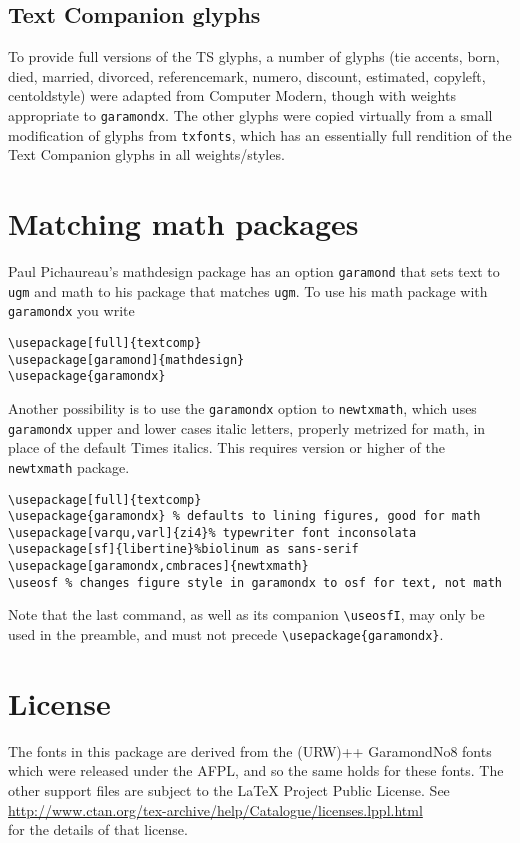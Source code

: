 \documentclass[11pt]{article}
\begin{document}
\subsection{Text Companion glyphs} To provide full versions of the TS glyphs, a number of glyphs (tie accents, born, died, married, divorced, referencemark, numero, discount, estimated, copyleft, centoldstyle) were adapted from Computer Modern, though with weights appropriate to {\tt garamondx}. The other glyphs were copied virtually from a small modification of glyphs from {\tt txfonts}, which has an essentially full rendition of the Text Companion glyphs in all weights/styles.
\section{Matching math packages}
Paul Pichaureau's \textsf{mathdesign} package has an option \texttt{garamond} that sets text to \texttt{ugm} and math to his package that matches \texttt{ugm}. To use his math package with \texttt{garamondx} you write
\begin{verbatim}
\usepackage[full]{textcomp}
\usepackage[garamond]{mathdesign}
\usepackage{garamondx}
\end{verbatim}
Another possibility is to use the \texttt{garamondx} option to \texttt{newtxmath}, which uses \texttt{garamondx} upper and lower cases italic letters, properly metrized for math, in place of the default Times italics. This requires version  or higher of the \texttt{newtxmath} package. 
\begin{verbatim}
\usepackage[full]{textcomp}
\usepackage{garamondx} % defaults to lining figures, good for math
\usepackage[varqu,varl]{zi4}% typewriter font inconsolata
\usepackage[sf]{libertine}%biolinum as sans-serif
\usepackage[garamondx,cmbraces]{newtxmath}
\useosf % changes figure style in garamondx to osf for text, not math
\end{verbatim}
Note that the last command, as well as its companion \verb|\useosfI|, may only be used in the preamble, and must not precede \verb|\usepackage{garamondx}|.

\section{License}
The fonts in this package are derived from the (URW)++ GaramondNo8 fonts which were released under the AFPL, and so the same holds for these fonts. The other support files are subject to the LaTeX Project Public License. See\\
 \url{http://www.ctan.org/tex-archive/help/Catalogue/licenses.lppl.html}\\
  for the details of that license.
\end{document}

